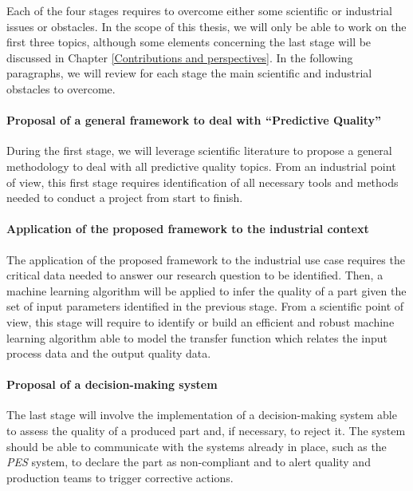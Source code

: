Each of the four stages requires to overcome either some scientific or industrial issues or obstacles. In the scope of this thesis, we will only be able to work on the first three topics, although some elements concerning the last stage will be discussed in Chapter \ref{Contributions and perspectives}. In the following paragraphs, we will review for each stage the main scientific and industrial obstacles to overcome.

\paragraph{Proposal of a general framework to deal with ``Predictive Quality''}

During the first stage, we will leverage scientific literature to propose a general methodology to deal with all predictive quality topics. From an industrial point of view, this first stage requires identification of all necessary tools and methods needed to conduct a project from start to finish.

\paragraph{Application of the proposed framework to the industrial context}

The application of the proposed framework to the industrial use case requires the critical data needed to answer our research question to be identified. Then, a machine learning algorithm will be applied to infer the quality of a part given the set of input parameters identified in the previous stage. From a scientific point of view, this stage will require to identify or build an efficient and robust machine learning algorithm able to model the transfer function which relates the input process data and the output quality data. 

\paragraph{Proposal of a decision-making system}

The last stage will involve the implementation of a decision-making system able to assess the quality of a produced part and, if necessary, to reject it. The system should be able to communicate with the systems already in place, such as the \textit{PES} system, to declare the part as non-compliant and to alert quality and production teams to trigger corrective actions. 

